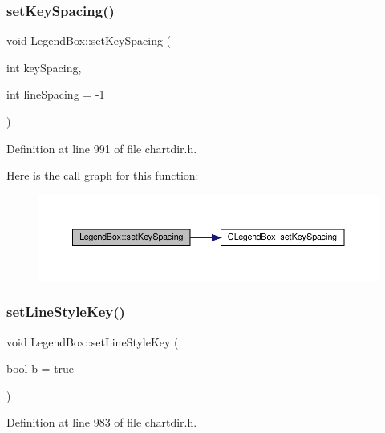 \subsubsection{\texorpdfstring{set\+Key\+Spacing()}{setKeySpacing()}}
{\footnotesize\ttfamily void Legend\+Box\+::set\+Key\+Spacing (\begin{DoxyParamCaption}\item[{int}]{key\+Spacing,  }\item[{int}]{line\+Spacing = {\ttfamily -\/1} }\end{DoxyParamCaption})\hspace{0.3cm}{\ttfamily [inline]}}



Definition at line 991 of file chartdir.\+h.

Here is the call graph for this function\+:
\nopagebreak
\begin{figure}[H]
\begin{center}
\leavevmode
\includegraphics[width=350pt]{class_legend_box_a800bcc36918eda6b0c38eef97086c0a8_cgraph}
\end{center}
\end{figure}
\mbox{\label{class_legend_box_ad358e74944257702f9099c7c41f936e5}} 
\subsubsection{\texorpdfstring{set\+Line\+Style\+Key()}{setLineStyleKey()}}
{\footnotesize\ttfamily void Legend\+Box\+::set\+Line\+Style\+Key (\begin{DoxyParamCaption}\item[{bool}]{b = {\ttfamily true} }\end{DoxyParamCaption})\hspace{0.3cm}{\ttfamily [inline]}}



Definition at line 983 of file chartdir.\+h.

